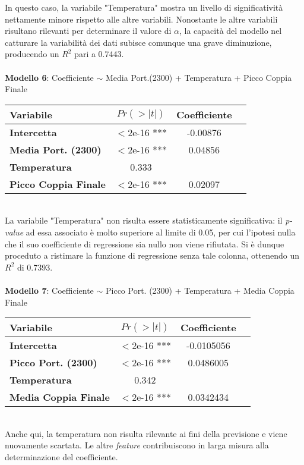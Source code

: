 \documentclass[fleqn,10pt]{SelfArx} %
\begin{document}
In questo caso, la variabile "Temperatura" mostra un livello di significatività nettamente minore rispetto alle altre variabili. Nonostante le altre variabili risultano rilevanti per determinare il valore di $\alpha$, la capacità del modello nel catturare la variabilità dei dati subisce comunque una grave diminuzione, producendo un $R^2$ pari a 0.7443.\\
\\
\textbf{Modello 6}: Coefficiente $\sim$ Media Port.(2300) + Temperatura + Picco Coppia Finale
{\begin{table}[h] 
\centering
\begin{tabular}[t]{lccc}
\toprule 
Variabile&$Pr(> |t|)$&Coefficiente\\
\midrule 
\textbf{Intercetta}&$<$2e-16 ***&-0.00876\\ 
\textbf{Media Port. (2300)}&$<$2e-16 ***&0.04856\\
\textbf{Temperatura}&0.333\\
\textbf{Picco Coppia Finale}&$<$2e-16 ***&0.02097\\
\bottomrule 
\end{tabular}
\end{table}}\\
La variabile "Temperatura" non risulta essere statisticamente significativa: il \textit{p-value} ad essa associato è molto superiore al limite di 0.05, per cui l'ipotesi nulla che il suo coefficiente di regressione sia nullo non viene rifiutata. Si è dunque proceduto a ristimare la funzione di regressione senza tale colonna, ottenendo un $R^2$ di 0.7393.\\
\\
\textbf{Modello 7}: Coefficiente $\sim$ Picco Port. (2300) + Temperatura + Media Coppia Finale
{\begin{table}[h] 
\centering
\begin{tabular}[t]{lccc}
\toprule 
Variabile&$Pr(> |t|)$&Coefficiente\\
\midrule 
\textbf{Intercetta}&$<$2e-16 ***&-0.0105056\\ 
\textbf{Picco Port. (2300)}&$<$2e-16 ***&0.0486005\\
\textbf{Temperatura}&0.342\\
\textbf{Media Coppia Finale}&$<$2e-16 ***&0.0342434\\
\bottomrule 
\end{tabular}
\end{table}}\\
Anche qui, la temperatura non risulta rilevante ai fini della previsione e viene nuovamente scartata. Le altre \textit{feature} contribuiscono in larga misura alla determinazione del coefficiente.
\end{document}
